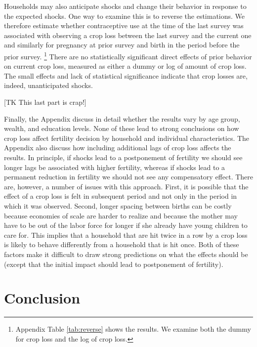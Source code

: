 \documentclass[letterpaper,12pt]{article}
\begin{document}

Households may also anticipate shocks and
change their behavior in response to the expected shocks.
One way to examine this is to reverse the estimations.
We therefore estimate whether contraceptive use at the time of the last 
survey was associated with observing a crop loss between the last survey
and the current one and similarly for pregnancy at prior survey and 
birth in the period before the prior survey.%
\footnote{
Appendix Table \ref{tab:reverse} shows the results.
We examine both the dummy for crop loss and the log of crop loss.
}
There are no statistically significant direct effects of 
prior behavior on current crop loss, measured as either a
dummy or log of amount of crop loss.
The small effects and lack of statistical significance 
indicate that crop losses are, indeed, unanticipated 
shocks.


[TK This last part is crap!]

Finally, the Appendix discuss in detail whether the results 
vary by age group, wealth, and education levels.
None of these lead to strong conclusions on how crop loss 
affect fertility decision by household and individual
characteristics.
The Appendix also discuss how including additional lags
of crop loss affects the results.
In principle, if shocks lead to a postponement of fertility we 
should see longer lags be associated with higher fertility, 
whereas if shocks lead to a permanent reduction in fertility we
should not see any compensatory effect.
There are, however, a number of issues with this approach.
First, it is possible that the effect of a crop loss is felt
in subsequent period and not only in the period in which it
was observed.
Second, longer spacing between births can be costly because economies
of scale are harder to realize and because the mother may have to 
be out of the labor force for longer if she already have young
children to care for.
This implies that a household that are hit twice in a row by
a crop loss is likely to behave differently from a household that
is hit once.
Both of these factors make it difficult to draw strong 
predictions on what the effects should be (except that the
initial impact should lead to postponement of fertility).





\section{Conclusion}
\end{document}
